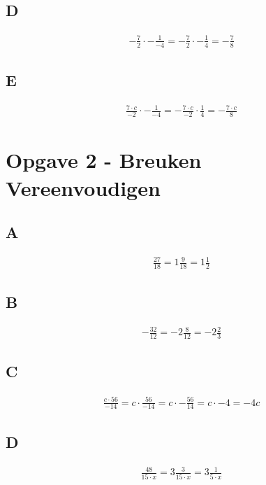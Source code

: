 \documentclass[fleqn]{article}
\begin{document}
\subsection{D}
\begin{align*}
    - \frac{7}{2} \cdot - \frac{1}{-4} = -\frac{7}{2} \cdot -\frac{1}{4} = -\frac{7}{8}
\end{align*}

\subsection{E}
\begin{align*}
    \frac{7 \cdot c}{-2} \cdot -\frac{1}{-4} = -\frac{7 \cdot c}{-2} \cdot \frac{1}{4} = -\frac{7 \cdot c}{8}
\end{align*}

\clearpage
\section{Opgave 2 - Breuken Vereenvoudigen}
\subsection{A}
\begin{align*}
    \frac{27}{18}=1\frac{9}{18} = 1\frac{1}{2}
\end{align*}

\subsection{B}
\begin{align*}
    -\frac{32}{12}=-2\frac{8}{12}=-2\frac{2}{3}
\end{align*}

\subsection{C}
\begin{align*}
    \frac{c \cdot 56}{-14} = c\cdot \frac{56}{-14} = c \cdot -\frac{56}{14} = c \cdot -4 = -4c
\end{align*}

\subsection{D}
\begin{align*}
    \frac{48}{15 \cdot x} = 3\frac{3}{15 \cdot x} = 3 \frac{1}{5 \cdot x}
\end{align*}
\end{document}
